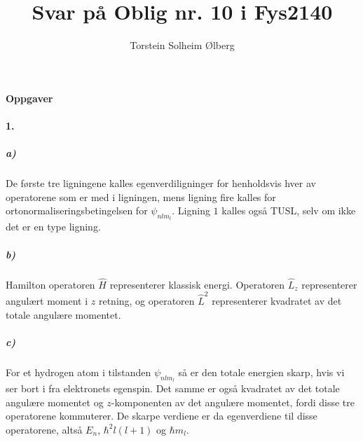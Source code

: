 \documentclass[11pt, A4paper,norsk]{article}
\author{Torstein Solheim Ølberg}
\title{Svar på Oblig nr. 10 i Fys2140}
\begin{document}
\maketitle
	\begin{center}
\Large \textbf{Oppgaver}
	\end{center}









		\paragraph{1.}
			\subparagraph{a)}
				\begin{flushleft}
De første tre ligningene kalles egenverdiligninger for henholdsvis hver av operatorene som er med i ligningen, mens ligning fire kalles for ortonormaliseringsbetingelsen for $\psi_{nlm_{l}}$. Ligning $1$ kalles også TUSL, selv om ikke det er en type ligning.
				\end{flushleft}









			\subparagraph{b)}
				\begin{flushleft}
Hamilton operatoren $\hat{H}$ representerer klassisk energi. Operatoren $\hat{L}_z$ representerer angulært moment i $z$ retning, og operatoren $\hat{L}^2$ representerer kvadratet av det totale angulære momentet.
				\end{flushleft}









			\subparagraph{c)}
				\begin{flushleft}
For et hydrogen atom i tilstanden $\psi_{nlm_{l}}$ så er den totale energien skarp, hvis vi ser bort i fra elektronets egenspin. Det samme er også kvadratet av det totale angulære momentet og $z$-komponenten av det angulære momentet, fordi disse tre operatorene kommuterer. De skarpe verdiene er da egenverdiene til disse operatorene, altså $E_n$, $\hbar^2 l ( l + 1 )$ og $\hbar m_l$.
				\end{flushleft}

			
\end{document}
